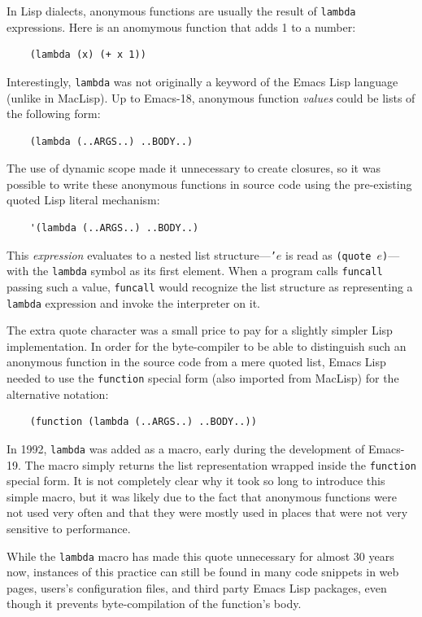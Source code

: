 \documentclass[format=acmsmall, review]{acmart}
\newcommand \Elisp {Emacs Lisp}
\begin{document}
In Lisp dialects, anonymous functions are usually the result of
\texttt{lambda} expressions.  Here is an anomymous function that adds
1 to a number:
%
\begin{verbatim}
    (lambda (x) (+ x 1))
\end{verbatim}
%
Interestingly, \texttt{lambda} was not originally a keyword of the
\Elisp{} language (unlike in MacLisp).  Up to Emacs-18, anonymous
function \emph{values} could be lists of the following form:
%
\begin{verbatim}
    (lambda (..ARGS..) ..BODY..)
\end{verbatim}
%
The use of dynamic scope made it unnecessary to create closures, so it was
possible to write these anonymous functions in source code using the
pre-existing quoted Lisp literal mechanism:
%
\begin{verbatim}
    '(lambda (..ARGS..) ..BODY..)
\end{verbatim}
%
This \emph{expression} evaluates to a nested list structure---\texttt{'}$e$
is read as \texttt{(quote \textnormal{$e$})}---with the
\texttt{lambda} symbol as its first element.  When a program calls
\texttt{funcall} passing such a value, \texttt{funcall} would
recognize the list structure as representing a \texttt{lambda}
expression and invoke the interpreter on it.

The extra quote character was a small price to pay for a slightly
simpler Lisp implementation.  In order for the byte-compiler to be able
to distinguish such an anonymous function in the source code from a mere
quoted list, \Elisp{} needed to use the \texttt{function} special form (also
imported from MacLisp) for the alternative notation:
%
\begin{verbatim}
    (function (lambda (..ARGS..) ..BODY..))
\end{verbatim}
%
In 1992, \texttt{lambda} was added as a macro, early during the
development of Emacs-19.  The macro simply returns the list representation
wrapped inside the \texttt{function} special form.  It is not completely
clear why it took so long to introduce this simple macro, but it was likely
due to the fact that anonymous functions were not used very often and that
they were mostly used in places that were not very sensitive to performance.

While the \texttt{lambda} macro has made this quote unnecessary for almost
30 years now, instances of this practice can still be found in many code
snippets in web pages, users's configuration files, and third party \Elisp{}
packages, even though it prevents byte-compilation of the function's body.
\end{document}
